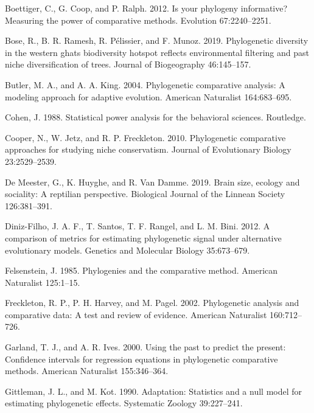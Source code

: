 \documentclass[
]{article}
\begin{document}
\leavevmode\hypertarget{ref-Boettiger_et_al2012}{}%
Boettiger, C., G. Coop, and P. Ralph. 2012. Is your phylogeny
informative? Measuring the power of comparative methods. Evolution
67:2240--2251.

\leavevmode\hypertarget{ref-Bose2019}{}%
Bose, R., B. R. Ramesh, R. Pélissier, and F. Munoz. 2019. Phylogenetic
diversity in the western ghats biodiversity hotspot reflects
environmental filtering and past niche diversification of trees. Journal
of Biogeography 46:145--157.

\leavevmode\hypertarget{ref-ButlerKing2004}{}%
Butler, M. A., and A. A. King. 2004. Phylogenetic comparative analysis:
A modeling approach for adaptive evolution. American Naturalist
164:683--695.

\leavevmode\hypertarget{ref-Cohen1988}{}%
Cohen, J. 1988. Statistical power analysis for the behavioral sciences.
Routledge.

\leavevmode\hypertarget{ref-Cooper2010}{}%
Cooper, N., W. Jetz, and R. P. Freckleton. 2010. Phylogenetic
comparative approaches for studying niche conservatism. Journal of
Evolutionary Biology 23:2529--2539.

\leavevmode\hypertarget{ref-DeMeester2019}{}%
De Meester, G., K. Huyghe, and R. Van Damme. 2019. Brain size, ecology
and sociality: A reptilian perspective. Biological Journal of the
Linnean Society 126:381--391.

\leavevmode\hypertarget{ref-DinizFilho2012}{}%
Diniz-Filho, J. A. F., T. Santos, T. F. Rangel, and L. M. Bini. 2012. A
comparison of metrics for estimating phylogenetic signal under
alternative evolutionary models. Genetics and Molecular Biology
35:673--679.

\leavevmode\hypertarget{ref-Felsenstein1985}{}%
Felsenstein, J. 1985. Phylogenies and the comparative method. American
Naturalist 125:1--15.

\leavevmode\hypertarget{ref-Freckleton_et_al2002}{}%
Freckleton, R. P., P. H. Harvey, and M. Pagel. 2002. Phylogenetic
analysis and comparative data: A test and review of evidence. American
Naturalist 160:712--726.

\leavevmode\hypertarget{ref-GarlandIves2000}{}%
Garland, T. J., and A. R. Ives. 2000. Using the past to predict the
present: Confidence intervals for regression equations in phylogenetic
comparative methods. American Naturalist 155:346--364.

\leavevmode\hypertarget{ref-Gittleman1990}{}%
Gittleman, J. L., and M. Kot. 1990. Adaptation: Statistics and a null
model for estimating phylogenetic effects. Systematic Zoology
39:227--241.
\end{document}
